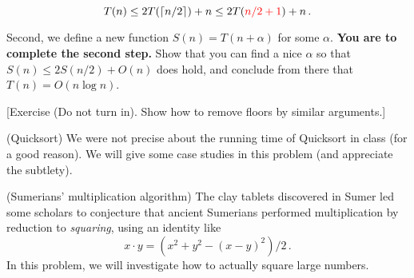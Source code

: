 \begin{questions}
  \[T(n) \le 2T(\lceil n/2 \rceil) +n \leq 2T({\color{red} n/2 + 1}) +
    n \, .\]

  Second, we define a new function $S(n) = T(n + \alpha)$ for some
  $\alpha$. \textbf{You are to complete the second step.} Show that
  you can find a nice $\alpha$ so that $S(n)\le 2S(n/2) + O(n)$ does
  hold, and conclude from there that $T(n) = O(n \log n)$. 

  [Exercise (Do not turn in). Show how to remove floors by similar
  arguments.]

  \newpage
  \question (Quicksort) We were not precise about the running time
  of Quicksort in class (for a good reason). We will give some case
  studies in this problem (and appreciate the subtlety). 

  \newpage
  
\question (Sumerians' multiplication algorithm) The clay tablets
discovered in Sumer led some scholars to conjecture that ancient
Sumerians performed multiplication by reduction to \emph{squaring},
using an identity like \[x\cdot y = (x^2 + y^2 - (x - y)^2)/2 \, .\] In this
problem, we will investigate how to actually square large numbers.

\end{questions}
